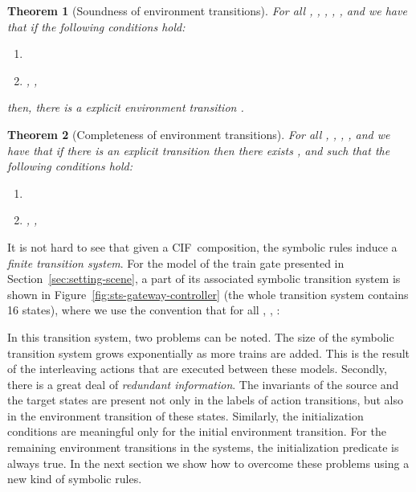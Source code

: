 \documentclass[submission,copyright,creativecommons,sharealike]{eptcs}
\newcommand{\CIF}{{CIF}}
\newtheorem{theorem}{Theorem}
\begin{document}
\begin{theorem}[Soundness of environment transitions]
  \label{theo:soundness-etrans}
  For all , , , ,
  , and  we have that if the following conditions
  hold:
  \begin{enumerate}
  \item 
  \item , , 
  \end{enumerate}
  then, there is a explicit environment transition
  .
\end{theorem}

\begin{theorem}[Completeness of environment transitions]
  \label{theo:completeness-etrans}
  For all , , , , and  we have that if
  there is an explicit transition  then there exists , and  such that the following
  conditions hold:
  \begin{enumerate}
  \item 
  \item , , 
  \end{enumerate}
\end{theorem}

It is not hard to see that given a \CIF\ composition, the symbolic
rules induce a \emph{finite transition system}. For the model of the
train gate presented in Section~\ref{sec:setting-scene}, a part of its
associated symbolic transition system is shown in
Figure~\ref{fig:sts-gateway-controller} (the whole transition system
contains 16 states), where we use the convention that for all ,
, :

In this transition system, two problems can be noted. The size of the
symbolic transition system grows exponentially as more trains are
added. This is the result of the interleaving actions that are
executed between these models.
Secondly, there is a great deal of \emph{redundant information}. The
invariants of the source and the target states are present not only in
the labels of action transitions, but also in the environment
transition of these
states. Similarly, the initialization conditions are meaningful only
for the initial environment transition. For the remaining environment
transitions in the systems, the initialization predicate is always
true. In the next section we show how to overcome these
problems using a new kind of symbolic rules.
\end{document}
